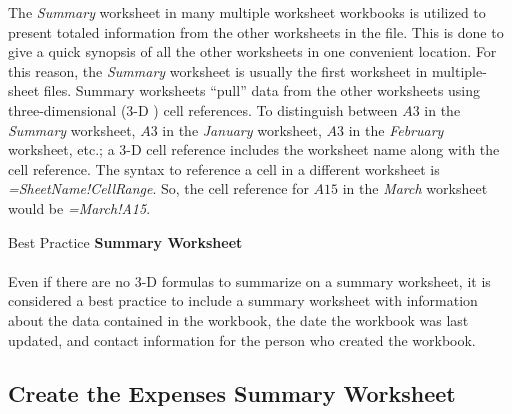 The \textit{Summary} worksheet in many multiple worksheet workbooks is utilized to present totaled information from the other worksheets in the file. This is done to give a quick synopsis of all the other worksheets in one convenient location. For this reason, the \textit{Summary} worksheet is usually the first worksheet in multiple-sheet files. Summary worksheets ``pull'' data from the other worksheets using three-dimensional ($ 3 $-D ) cell references. To distinguish between $ A3 $ in the \textit{Summary} worksheet, $ A3 $ in the \textit{January} worksheet, $ A3 $ in the \textit{February} worksheet, etc.; a $ 3 $-D cell reference includes the worksheet name along with the cell reference. The syntax to reference a cell in a different worksheet is \textit{=SheetName!CellRange}. So, the cell reference for $ A15 $ in the \textit{March} worksheet would be \textit{=March!A15}.

\begin{center}
	\begin{infobox}{Best Practice}
		\textbf{Summary Worksheet}
		\\
		\\
		Even if there are no $ 3 $-D formulas to summarize on a summary worksheet, it is considered a best practice to include a summary worksheet with information about the data contained in the workbook, the date the workbook was last updated, and contact information for the person who created the workbook.
	\end{infobox}
\end{center}

\subsection{Create the Expenses Summary Worksheet}

